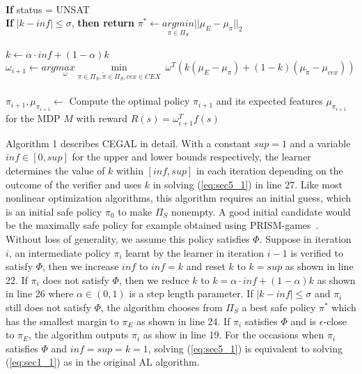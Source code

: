\begin{algorithm}[htb]
\begin{algorithmic}[1]
\\\qquad\qquad \textbf{If} status = UNSAT
\\\qquad\qquad\qquad \textbf{If} $|k - inf|\leq\sigma$, {\bf then return} $\pi^*\leftarrow\underset{{\pi}\in \Pi_S}{argmin}||\mu_E - \mu_{{\pi}}||_2$\\
\\\qquad\qquad\qquad $k \leftarrow \alpha\cdot inf + (1 - \alpha)k$ 
\\\qquad\qquad $\omega_{i+1} \leftarrow arg\underset{\omega}{max}\underset{\pi\in\Pi_S, \tilde{\pi}\in\Pi_S, cex\in CEX}{\min}\ \omega^T(k(\mu_E - \mu_{\pi})+(1-k)(\mu_{\tilde{\pi}}  - \mu_{cex}))$
\\ 
\\\qquad\qquad $\pi_{i+1}, \mu_{\pi_{i+1}}\gets$ Compute the optimal policy $\pi_{i+1}$ and its expected features $\mu_{\pi_{i+1}}$ for the MDP $M$ with reward $R(s)=\omega_{i+1}^T f(s)$
\\
\end{algorithmic}
\label{algo1}
\end{algorithm}

Algorithm 1 describes CEGAL in detail. 
With a constant $sup=1$ and a variable $inf\in[0, sup]$ for the upper and lower bounds respectively, the learner determines the value of $k$ within $[inf, sup]$ in each iteration depending on the outcome of the verifier and uses $k$ in solving (\ref{eq:sec5_1}) in line 27. 
Like most nonlinear optimization algorithms, this algorithm requires an initial guess, which is an initial safe policy $\pi_0$ to make $\Pi_S$ nonempty. A good initial candidate would be the maximally safe policy for example obtained using PRISM-games~{\cite{Kwiatkowska2017}}. 
Without loss of generality, we assume this policy satisfies $\Phi$.
Suppose in iteration $i$, an intermediate policy $\pi_i$ learnt by the learner in iteration $i-1$ is verified to satisfy $\Phi$, then we increase $inf$ to $inf=k$ and reset $k$ to $k=sup$ as shown in line 22. 
If $\pi_i$ does not satisfy $\Phi$, then we reduce $k$ to $k=\alpha\cdot inf + (1 - \alpha)k$  as shown in line 26 where $\alpha\in(0, 1)$ is a step length parameter. 
If $|k-inf|\leq\sigma$ and $\pi_i$ still does not satisfy $\Phi$, the algorithm chooses from $\Pi_S$ a best safe policy $\pi^*$ which has the smallest margin to $\pi_E$ as shown in line 24. If $\pi_i$ satisfies $\Phi$ and is {$\epsilon$-close} to $\pi_E$, the algorithm outputs $\pi_i$ as show in line 19. For the occasions when $\pi_i$ satisfies $\Phi$ and $inf = sup = k = 1$, solving (\ref{eq:sec5_1}) is equivalent to solving (\ref{eq:sec1_1}) as in the original AL algorithm.

